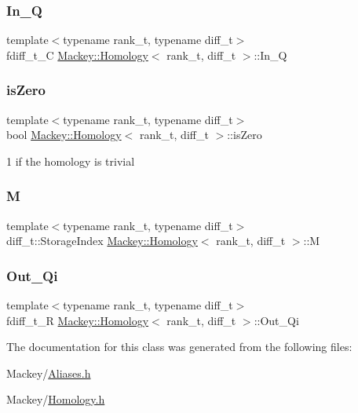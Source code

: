 \subsubsection{\texorpdfstring{In\+\_\+Q}{In\_Q}}
{\footnotesize\ttfamily template$<$typename rank\+\_\+t, typename diff\+\_\+t$>$ \\
fdiff\+\_\+t\+\_\+C \hyperlink{classMackey_1_1Homology}{Mackey\+::\+Homology}$<$ rank\+\_\+t, diff\+\_\+t $>$\+::In\+\_\+Q}

\mbox{\label{classMackey_1_1Homology_ae3bb3781bab2b5884295e04a8fddf36e}} 
\subsubsection{\texorpdfstring{is\+Zero}{isZero}}
{\footnotesize\ttfamily template$<$typename rank\+\_\+t, typename diff\+\_\+t$>$ \\
bool \hyperlink{classMackey_1_1Homology}{Mackey\+::\+Homology}$<$ rank\+\_\+t, diff\+\_\+t $>$\+::is\+Zero}



1 if the homology is trivial 

\mbox{\label{classMackey_1_1Homology_a904d8b7e452d276930b19e592fe3cda5}} 
\subsubsection{\texorpdfstring{M}{M}}
{\footnotesize\ttfamily template$<$typename rank\+\_\+t, typename diff\+\_\+t$>$ \\
diff\+\_\+t\+::\+Storage\+Index \hyperlink{classMackey_1_1Homology}{Mackey\+::\+Homology}$<$ rank\+\_\+t, diff\+\_\+t $>$\+::M}

\mbox{\label{classMackey_1_1Homology_a49fa2fbf9542e38b4000f4889f633f62}} 
\subsubsection{\texorpdfstring{Out\+\_\+\+Qi}{Out\_Qi}}
{\footnotesize\ttfamily template$<$typename rank\+\_\+t, typename diff\+\_\+t$>$ \\
fdiff\+\_\+t\+\_\+R \hyperlink{classMackey_1_1Homology}{Mackey\+::\+Homology}$<$ rank\+\_\+t, diff\+\_\+t $>$\+::Out\+\_\+\+Qi}



The documentation for this class was generated from the following files\+:\begin{DoxyCompactItemize}
\item 
Mackey/\hyperlink{Aliases_8h}{Aliases.\+h}\item 
Mackey/\hyperlink{Homology_8h}{Homology.\+h}\end{DoxyCompactItemize}
